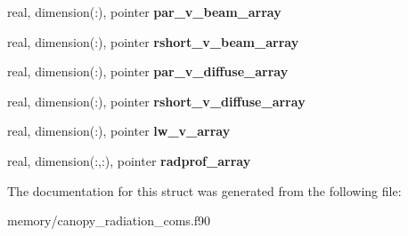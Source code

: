 \begin{DoxyCompactItemize}
\item 
\hypertarget{structcanopy__radiation__coms_1_1radscrtype_a1b384b5eef61d4cac09eef42f754eddb}{
real, dimension(:), pointer {\bfseries par\_\-v\_\-beam\_\-array}}
\label{structcanopy__radiation__coms_1_1radscrtype_a1b384b5eef61d4cac09eef42f754eddb}

\item 
\hypertarget{structcanopy__radiation__coms_1_1radscrtype_ae8b32bc0eb0dcbbe7285b1a4ddec3bff}{
real, dimension(:), pointer {\bfseries rshort\_\-v\_\-beam\_\-array}}
\label{structcanopy__radiation__coms_1_1radscrtype_ae8b32bc0eb0dcbbe7285b1a4ddec3bff}

\item 
\hypertarget{structcanopy__radiation__coms_1_1radscrtype_afc4f0bac25e91f1f7a5fb1e783cfac91}{
real, dimension(:), pointer {\bfseries par\_\-v\_\-diffuse\_\-array}}
\label{structcanopy__radiation__coms_1_1radscrtype_afc4f0bac25e91f1f7a5fb1e783cfac91}

\item 
\hypertarget{structcanopy__radiation__coms_1_1radscrtype_ab9eabd5fbf2f1294fa8371969793544f}{
real, dimension(:), pointer {\bfseries rshort\_\-v\_\-diffuse\_\-array}}
\label{structcanopy__radiation__coms_1_1radscrtype_ab9eabd5fbf2f1294fa8371969793544f}

\item 
\hypertarget{structcanopy__radiation__coms_1_1radscrtype_af503c366a9e6a6201726e04fd18a204c}{
real, dimension(:), pointer {\bfseries lw\_\-v\_\-array}}
\label{structcanopy__radiation__coms_1_1radscrtype_af503c366a9e6a6201726e04fd18a204c}

\item 
\hypertarget{structcanopy__radiation__coms_1_1radscrtype_a7e59eda891bcc1f2f526e09205addcc4}{
real, dimension(:,:), pointer {\bfseries radprof\_\-array}}
\label{structcanopy__radiation__coms_1_1radscrtype_a7e59eda891bcc1f2f526e09205addcc4}

\end{DoxyCompactItemize}


The documentation for this struct was generated from the following file:\begin{DoxyCompactItemize}
\item 
memory/canopy\_\-radiation\_\-coms.f90\end{DoxyCompactItemize}

